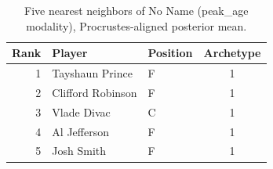 \begin{table}[htbp]
  \centering\small
  \begin{tabular}{rllc}
    \toprule
    Rank & Player & Position & Archetype \\
    \midrule
    1 & Tayshaun Prince & F & 1 \\
    2 & Clifford Robinson & F & 1 \\
    3 & Vlade Divac & C & 1 \\
    4 & Al Jefferson & F & 1 \\
    5 & Josh Smith & F & 1 \\
    \bottomrule
  \end{tabular}
  \caption{Five nearest neighbors of No Name (peak_age modality), Procrustes-aligned posterior mean.}
  \label{tab:No_Name_neighbors_peak_age}
\end{table}

